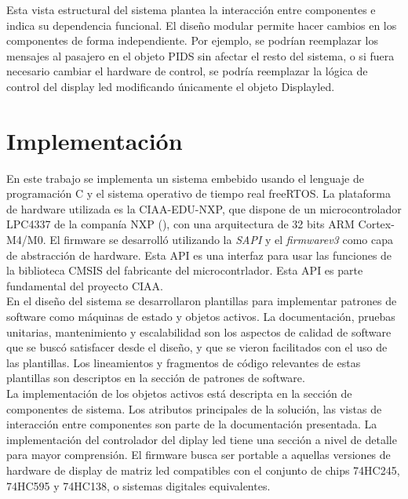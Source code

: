 Esta vista estructural del sistema plantea la interacción entre componentes e indica su dependencia funcional. El diseño modular permite hacer cambios en los componentes de forma independiente. Por ejemplo, se podrían reemplazar los mensajes al pasajero en el objeto PIDS sin afectar el resto del sistema, o si fuera necesario cambiar el hardware de control, se podría reemplazar la lógica de control del display led modificando únicamente el objeto Displayled.\\


\section{Implementación}
En este trabajo se implementa un sistema embebido usando el lenguaje de programación C y el sistema operativo de tiempo real freeRTOS. La plataforma de hardware utilizada es la CIAA-EDU-NXP, que dispone de un microcontrolador LPC4337 de la companía NXP (\citep{NXPLPC4337}), con una arquitectura de 32 bits ARM Cortex-M4/M0. El firmware se desarrolló utilizando la \textit{SAPI} y el \textit{firmwarev3} \citep{firmwarev3} como capa de abstracción de hardware. Esta API es una interfaz para usar las funciones de la biblioteca CMSIS del fabricante del microcontrlador. Esta API es parte fundamental del proyecto CIAA.\\
 
En el diseño del sistema se desarrollaron plantillas para implementar patrones de software como máquinas de estado y objetos activos. La documentación, pruebas unitarias, mantenimiento y escalabilidad son los aspectos de calidad de software que se buscó satisfacer desde el diseño, y que se vieron facilitados con el uso de las plantillas. Los lineamientos y fragmentos de código relevantes de estas plantillas son descriptos en la sección de patrones de software. \\

La implementación de los objetos activos está descripta en la sección de componentes de sistema. Los atributos principales de la solución, las vistas de interacción entre componentes son parte de la documentación presentada. La implementación del controlador del diplay led tiene una sección a nivel de detalle para mayor comprensión. El firmware busca ser portable a aquellas versiones de hardware de display de matriz led compatibles con el conjunto de chips 74HC245, 74HC595 y 74HC138, o sistemas digitales equivalentes. \\



